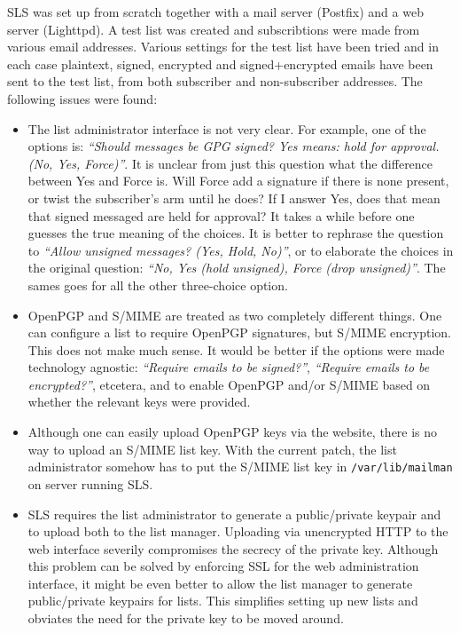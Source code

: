 \documentclass[a4]{article}
\begin{document}
SLS was set up from scratch together with a mail server (Postfix) and a web server (Lighttpd).
A test list was created and subscribtions were made from various email addresses.
Various settings for the test list have been tried and in each case plaintext, signed, encrypted and signed+encrypted emails have been sent to the test list, from both subscriber and non-subscriber addresses.
The following issues were found:
\begin{itemize}
\item
The list administrator interface is not very clear.
For example, one of the options is:
\textit{``Should messages be GPG signed? Yes means: hold for approval. (No, Yes, Force)''}.
It is unclear from just this question what the difference between Yes and Force is.
Will Force add a signature if there is none present, or twist the subscriber's arm until he does?
If I answer Yes, does that mean that signed messaged are held for approval?
It takes a while before one guesses the true meaning of the choices.
It is better to rephrase the question to
\textit{``Allow unsigned messages? (Yes, Hold, No)''}, or
to elaborate the choices in the original question: \textit{``No, Yes (hold unsigned), Force (drop unsigned)''}.
The sames goes for all the other three-choice option.

\item
OpenPGP and S/MIME are treated as two completely different things.
One can configure a list to require OpenPGP signatures, but S/MIME encryption.
This does not make much sense.
It would be better if the options were made technology agnostic:
\textit{``Require emails to be signed?''}, \textit{``Require emails to be encrypted?''}, etcetera,
and to enable OpenPGP and/or S/MIME based on whether the relevant keys were provided.

\item
Although one can easily upload OpenPGP keys via the website,
there is no way to upload an S/MIME list key.
With the current patch, the list administrator somehow has to put the S/MIME list key
in \verb|/var/lib/mailman| on server running SLS.

\item
SLS requires the list administrator to generate a public/private keypair and to upload both to the list manager.
Uploading via unencrypted HTTP to the web interface severily compromises the secrecy of the private key.
Although this problem can be solved by enforcing SSL for the web administration interface,
it might be even better to allow the list manager to generate public/private keypairs for lists.
This simplifies setting up new lists and obviates the need for the private key to be moved around.


\end{itemize}
\end{document}
